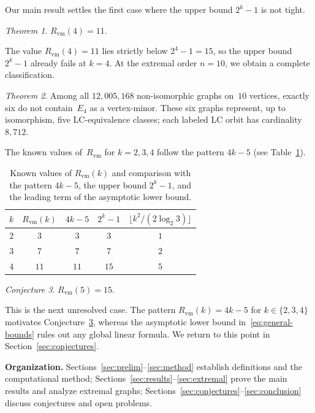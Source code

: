 \documentclass[11pt]{amsart}
\theoremstyle{definition}
\theoremstyle{remark}
\newtheorem{lettertheorem}{Theorem}
\newtheorem{letterconjecture}[lettertheorem]{Conjecture}
\newcommand{\Rvm}{R_{\mathrm{vm}}}
\begin{document}
Our main result settles the first case where the upper bound
$2^k-1$ is not tight.

\begin{lettertheorem}\label{thm:A}
  $\Rvm(4) = 11$.
\end{lettertheorem}

The value $\Rvm(4)=11$ lies strictly below $2^4-1=15$, so the upper bound $2^k-1$ already fails at $k=4$.  At the
extremal order $n=10$, we obtain a complete classification.

\begin{lettertheorem}\label{thm:B}
  Among all $12{,}005{,}168$ non-isomorphic graphs on~$10$ vertices,
  exactly six do not contain~$E_4$ as a vertex-minor.  These six graphs
  represent, up to isomorphism, five LC-equivalence classes; each
  labeled LC orbit has cardinality~$8{,}712$.
\end{lettertheorem}

The known values of~$\Rvm$ for $k=2,3,4$ follow the pattern
$4k-5$ (see Table~\ref{tab:values}).

\begin{table}[ht]
  \centering
  \caption{Known values of $\Rvm(k)$ and comparison with the pattern
    $4k-5$, the upper bound $2^k-1$, and the leading term of the
    asymptotic lower bound.}
  \label{tab:values}
  \begin{tabular}{ccccc}
    \toprule
    $k$ & $\Rvm(k)$ & $4k-5$ & $2^k-1$ &
      $\lfloor k^2/(2\log_2 3)\rfloor$ \\
    \midrule
    $2$ & $3$  & $3$  & $3$  & $1$ \\
    $3$ & $7$  & $7$  & $7$  & $2$ \\
    $4$ & $11$ & $11$ & $15$ & $5$ \\
    \bottomrule
  \end{tabular}
\end{table}

\begin{letterconjecture}\label{conj:C}
  $\Rvm(5)=15$.
\end{letterconjecture}

This is the next unresolved case.  The pattern $\Rvm(k)=4k-5$ for
$k\in\{2,3,4\}$ motivates Conjecture~\ref{conj:C}, whereas the
asymptotic lower bound in~\eqref{eq:general-bounds} rules out any global
linear formula.  We return to this point in
Section~\ref{sec:conjectures}.

\medskip
\noindent\textbf{Organization.}
Sections~\ref{sec:prelim}--\ref{sec:method} establish definitions and
the computational method;
Sections~\ref{sec:results}--\ref{sec:extremal} prove the main results
and analyze extremal graphs;
Sections~\ref{sec:conjectures}--\ref{sec:conclusion} discuss conjectures
and open problems.
\end{document}
